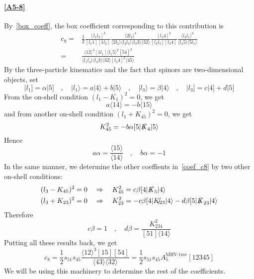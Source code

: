 \paragraph{\ref{A5-8}}
By~\cref{box_coeff}, the box coefficient corresponding to this contribution is
\begin{equation*}
\begin{split}
c_8 = & \frac{1}{2}
\frac{[l_1 l_2]^3}{[l_1 1][1l_2]}
\frac{\langle 2 l_2 \rangle^4}{\langle 2l_2 \rangle\langle l_2 l_3\rangle\langle l_3 3 \rangle\langle 32 \rangle}
\frac{[l_4 4 ]^3}{[l_4 l_3][l_3 4]}
\frac{\langle l_4 l_1 \rangle^3}{\langle l_4 5 \rangle\langle 5 l_1\rangle}
\\
= &
\frac{\langle 12 \rangle^3[1l_1 ]\langle l_1 5\rangle^2 [54]^3}{\langle l_1 l_3\rangle\langle l_3 3 \rangle\langle 32 \rangle [l_3 4 ]^2\langle 45\rangle}
\end{split}
\end{equation*}
By the three-particle kinematics and the fact that spinors are two-dimensional objects, set
\begin{equation}\label{coef_c8}
|l_1] = \alpha |5]
\quad,\quad
|l_1\rangle = a|4\rangle + b|5\rangle
\quad,\quad
|l_3\rangle = \beta |4\rangle
\quad,\quad
|l_3] = c|4] + d|5]
\end{equation}
From the on-shell condition $(l_1 - K_1)^2 = 0$, we get
\begin{equation*}
a\langle 14\rangle = -b\langle 15 \rangle
\end{equation*}
and from another on-shell condition $(l_1 + K_{45})^2 = 0$, we get
\begin{equation*}
K_{45}^2 = -b\alpha [5|\slashed{K}_4|5\rangle 
\end{equation*}
Hence
\begin{equation*}
a\alpha = \frac{\langle 15\rangle}{\langle 14\rangle}\quad,\quad
b\alpha = -1
\end{equation*}
In the same manner, we determine the other coeffients in~\cref{coef_c8} by two other on-shell conditions:
\begin{equation*}
\begin{split}
& (l_3 - K_{45})^2 = 0 \quad\Rightarrow\quad
K_{45}^2 = c\beta [4|\slashed{K}_5|4\rangle
\\
& (l_3 + K_{23})^2 = 0 \quad\Rightarrow\quad
K_{23}^2 = -c\beta [4|\slashed{K_{23}}|4\rangle - d\beta [5|\slashed{K}_{23}|4\rangle
\end{split}
\end{equation*}
Therefore
\begin{equation*}
c\beta = 1 \quad,\quad 
d\beta = \frac{K_{234}^2}{[51]\langle 14 \rangle}
\end{equation*}
Putting all these results back, we get
\begin{equation*}
c_8 = \frac{1}{2} s_{51}s_{45} \frac{\langle 12 \rangle^3 [15] [54]}{\langle 43 \rangle\langle 32 \rangle}=\frac{1}{2} s_{51}s_{45} A_5^{\textrm{MHV-tree}}[12345]
\end{equation*}
We will be using this machinery to determine the rest of the coefficients.
%
%
\iffalse
\begin{figure}
  \centering
    \texttt{[image: A5-10]}
    \caption{A5-10}
  \label{A5-10}
\end{figure}
\fi
%

